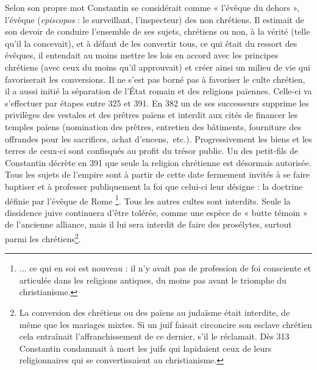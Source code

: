 Selon son propre mot Constantin se considérait comme « l'évêque du dehors », l'évêque (\emph{episcopos} : le surveillant, l'inspecteur) des non chrétiens. Il estimait de son devoir de conduire l'ensemble de ses sujets, chrétiens ou non, à la vérité (telle qu'il la concevait), et à défaut de les convertir tous, ce qui était du ressort des évêques, il entendait au moins mettre les lois en accord avec les principes chrétiens (avec ceux du moins qu'il approuvait) et créer ainsi un milieu de vie qui favoriserait les conversions. Il ne s'est pas borné pas à favoriser le culte chrétien, il a aussi initié la séparation de l'État romain et des religions païennes. Celle-ci va s'effectuer par étapes entre 325 et 391. En 382 un de ses successeurs supprime les privilèges des vestales et des prêtres païens et interdit aux cités de financer les temples païens (nomination des prêtres, entretien des bâtiments, fourniture des offrandes pour les sacrifices, achat d'encens,~etc.). Progressivement les biens et les terres de ceux-ci sont confisqués au profit du trésor public. Un des petit-fils de Constantin décrète en 391 que seule la religion chrétienne est désormais autorisée. Tous les sujets de l'empire sont à partir de cette date fermement invités à se faire baptiser et à professer publiquement la foi que celui-ci leur désigne : la doctrine définie par l'évêque de Rome \footnote{... ce qui en soi est nouveau : il n'y avait pas de profession de foi consciente et articulée dans les religions antiques, du moins pas avant le triomphe du christianisme.}. Tous les autres cultes sont interdits. Seule la dissidence juive continuera d'être tolérée, comme une espèce de « butte témoin » de l'ancienne alliance, mais il lui sera interdit de faire des prosélytes, surtout parmi les chrétiens\footnote{La conversion des chrétiens ou des païens au judaïsme était interdite, de même que les mariages mixtes. Si un juif faisait circoncire son esclave chrétien cela entraînait  l'affranchissement de ce dernier, s'il le réclamait. Dès 313 Constantin condamnait à mort les juifs qui lapidaient ceux de leurs religionnaires qui se convertissaient au christianisme.}. 


